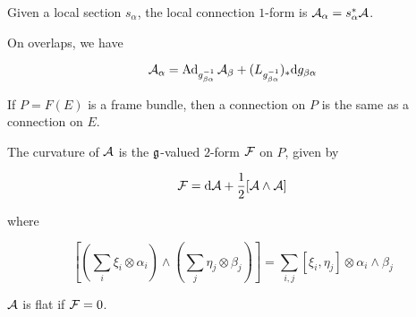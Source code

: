 Given a local section \(s_\alpha\), the local connection \(1\)-form is \(\mathcal{A}_\alpha = s_\alpha^*\mathcal{A}\).

\begin{lemma}
    On overlaps, we have

    \[\mathcal{A}_\alpha = \operatorname{Ad}_{g_{\beta\alpha}^{-1}}\mathcal{A}_\beta + (L_{g_{\beta\alpha}^{-1}})_*\dd g_{\beta\alpha}\]
\end{lemma}

\begin{remark}
    If \(P = F(E)\) is a frame bundle, then a connection on \(P\) is the same as a connection on \(E\).
\end{remark}

\begin{definition}
    [curvature] The curvature of \(\mathcal{A}\) is the \(\mathfrak{g}\)-valued \(2\)-form \(\mathcal{F}\) on \(P\), given by

    \[\mathcal{F} = \dd \mathcal{A} + \frac{1}{2}[\mathcal{A} \wedge \mathcal{A}]\]

    where

    \[\left[\left(\sum_i \xi_i\otimes \alpha_i\right)\wedge \left(\sum_j\eta_j\otimes\beta_j\right)\right] = \sum_{i, j}[\xi_i, \eta_j]\otimes \alpha_i \wedge \beta_j\]

    \(\mathcal{A}\) is flat if \(\mathcal{F} = 0\).
\end{definition}

